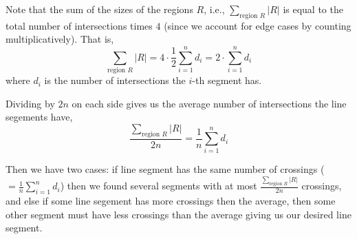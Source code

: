 \documentclass[12pt]{article}
\begin{document}
\begin{solution}
    \bbni
    
    Note that the sum of the sizes of the regions $R$, i.e., $\sum_{\text{region } R}|R|$ is equal to the total number of intersections times $4$ (since we account for edge cases by counting multiplicatively). That is, 
    \[\sum_{\text{region } R}|R| = 4 \cdot \frac{1}{2}\sum_{i = 1}^{n} d_i = 2 \cdot \sum_{i = 1}^{n} d_i \]
    where $d_i$ is the number of intersections the $i$-th segment has.  
    
    Dividing by $2n$ on each side gives us the average number of intersections the line segements have, 
    \[\frac{\sum_{\text{region } R}|R|}{2n} =  \frac{1}{n}  \sum_{i = 1}^{n} d_i \]

    Then we have two cases: if line segment has the same number of crossings ($=\frac{1}{n}  \sum_{i = 1}^{n} d_i$) then we found several segments with at most $\frac{\sum_{\text{region } R}|R|}{2n}$ crossings, and else if some line segement has more crossings then the average, then some other segment must have less crossings than the average giving us our desired line segment. 















\end{solution}

\newpage 
\end{document}
